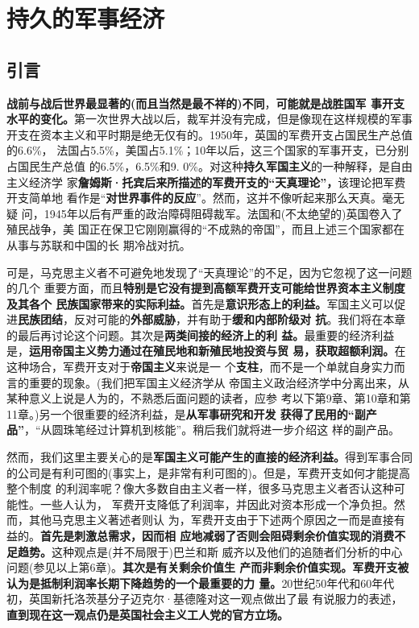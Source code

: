 \chapter{持久的军事经济}
\section{引言}
\textbf{战前与战后世界最显著的(而且当然是最不祥的)不同}，\textbf{可能就是战胜国军
  事开支水平的变化。}第一次世界大战以后，裁军并没有完成，但是像现在这样规模的军事
开支在资本主义和平时期是绝无仅有的。1950年，英国的军费开支占国民生产总值的6.6\%，
法国占5.5\%，美国占5.1\%；10年以后，这三个国家的军事开支，已分别占国民生产总值
的6.5\%，6.5\%和9. 0\%。对这种\textbf{持久军国主义}的一种解释，是自由主义经济学
家\textbf{詹姆斯·托宾后来所描述的军费开支的“天真理论”，}该理论把军费开支简单地
看作是“\textbf{对世界事件的反应}”。然而，这并不像听起来那么天真。毫无疑
问，1945年以后有严重的政治障碍阻碍裁军。法国和(不太绝望的)英国卷入了殖民战争，美
国正在保卫它刚刚赢得的“不成熟的帝国”，而且上述三个国家都在从事与苏联和中国的长
期冷战对抗。

可是，马克思主义者不可避免地发现了“天真理论”的不足，因为它忽视了这一问题的几个
重要方面，而且\textbf{特别是它没有提到高额军费开支可能给世界资本主义制度及其各个
  民族国家带来的实际利益。}首先是\textbf{意识形态上的利益。}军国主义可以促
进\textbf{民族团结}，反对可能的\textbf{外部威胁}，并有助于\textbf{缓和内部阶级对
  抗}。我们将在本章的最后再讨论这个问题。其次是\textbf{两类间接的经济上的利
  益。}最重要的经济利益是，\textbf{运用帝国主义势力通过在殖民地和新殖民地投资与贸
  易，获取超额利润。}在这种场合，军费开支对于\textbf{帝国主义}来说是一
个\textbf{支柱}，而不是一个单就自身实力而言的重要的现象。(我们把军国主义经济学从
帝国主义政治经济学中分离出来，从某种意义上说是人为的，不熟悉后面问题的读者，应参
考以下第9章、第10章和第11章。)另一个很重要的经济利益，是\textbf{从军事研究和开发
  获得了民用的“副产品”}，“从圆珠笔经过计算机到核能”。稍后我们就将进一步介绍这
样的副产品。

然而，我们这里主要关心的是\textbf{军国主义可能产生的直接的经济利益。}得到军事合同
的公司是有利可图的(事实上，是非常有利可图的)。但是，军费开支如何才能提高整个制度
的利润率呢？像大多数自由主义者一样，很多马克思主义者否认这种可能性。一些人认为，
军费开支降低了利润率，并因此对资本形成一个净负担。然而，其他马克思主义著述者则认
为，军费开支由于下述两个原因之一而是直接有益的。\textbf{首先是刺激总需求，因而相
  应地减弱了否则会阻碍剩余价值实现的消费不足趋势。}这种观点是(并不局限于)巴兰和斯
威齐以及他们的追随者们分析的中心问题(参见以上第6章)。\textbf{其次是有关剩余价值生
  产而非剩余价值实现。军费开支被认为是抵制利润率长期下降趋势的一个最重要的力
  量。}20世纪50年代和60年代初，英国新托洛茨基分子迈克尔·基德隆对这一观点做出了最
有说服力的表述，\textbf{直到现在这一观点仍是英国社会主义工人党的官方立场。}

